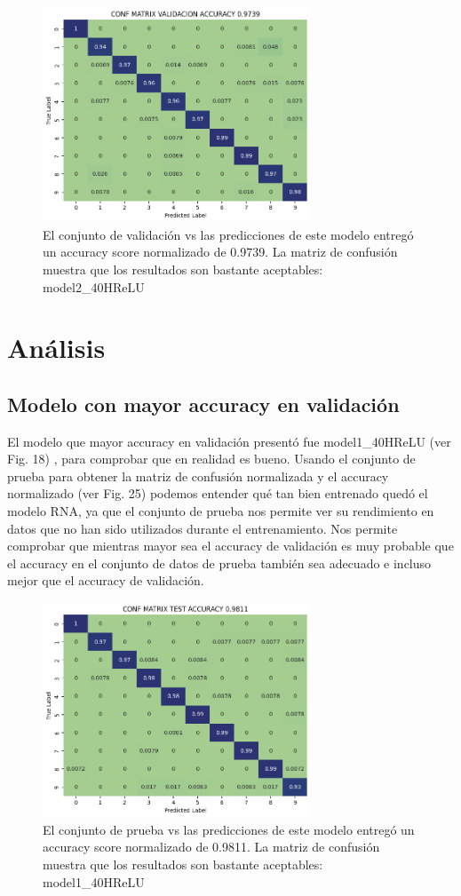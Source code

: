 \documentclass[journal]{IEEEtai}
\begin{document}
\begin{figure}[H]
\centering
\includegraphics[width=8cm]{img/model240HReLU/val.png}
\caption{El conjunto de validación vs las predicciones de este modelo entregó un accuracy score normalizado de  0.9739. La matriz de confusión muestra que los resultados son bastante aceptables: model2\_40HReLU}
\label{fig: model240HReLUVAL}
\end{figure}

\section{Análisis}

\subsection{Modelo con mayor accuracy en validación}

El modelo que mayor accuracy en validación presentó fue model1\_40HReLU (ver Fig. 18) , para comprobar que en realidad es bueno. Usando el conjunto de prueba para obtener la matriz de confusión normalizada y el accuracy normalizado (ver Fig. 25) podemos entender qué tan bien entrenado quedó el modelo RNA, ya que el conjunto de prueba nos permite ver su rendimiento en datos que no han sido utilizados durante el entrenamiento. 
Nos permite comprobar que mientras mayor sea el accuracy de validación es muy probable que el accuracy en el conjunto de datos de prueba también sea adecuado e incluso mejor que el accuracy de validación.

\begin{figure}[H]
\centering
\includegraphics[width=8cm]{img/betterAccuracyModel/test.png}
\caption{El conjunto de prueba vs las predicciones de este modelo entregó un accuracy score normalizado de  0.9811. La matriz de confusión muestra que los resultados son bastante aceptables: model1\_40HReLU}
\label{fig:  model140HTanhTEST}
\end{figure}
\end{document}

